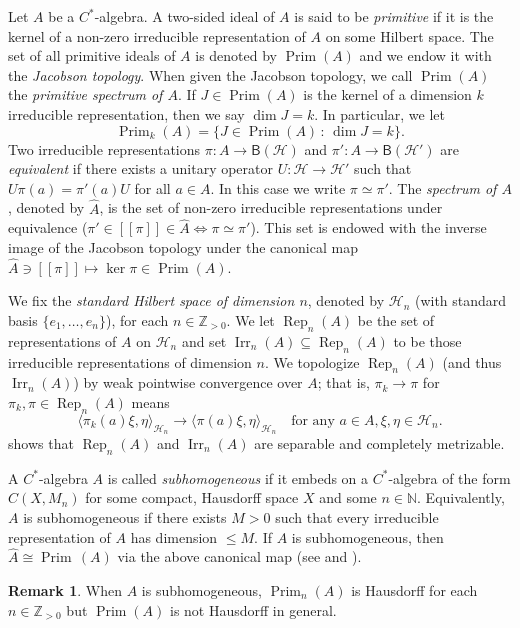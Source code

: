 \documentclass[11pt, twoside]{amsart}
\newcommand{\te}[1]{\operatorname{#1}}
\newcommand{\zn}{\mathbb{Z}}
\newcommand{\Prim}{\operatorname{Prim}}
\newcommand{\Repn}{\te{Rep}_n}
\newcommand{\Irrn}{\te{Irr}_n}
\newcommand{\sse}{\subseteq}
\newcommand{\mc}{\mathcal}
\newcommand{\wh}{\widehat}
\newcommand{\hn}{\mc{H}_n}
\newcommand{\bsf}{\textsf{B}}
\theoremstyle{definition}
\newtheorem{rmk}[thm]{Remark}
\newcommand{\B}{\mathbb}
\newcommand{\N}{\B{N}}
\begin{document}
Let $A$ be a $C^*$-algebra. A two-sided ideal of $A$ is said to be {\em primitive} if it is the kernel of a non-zero irreducible representation of $A$ on some Hilbert space. The set of all primitive ideals of $A$ is denoted by $\Prim(A)$ and we endow it with the {\em Jacobson topology}. When given the Jacobson topology, we call $\Prim(A)$ the {\em primitive spectrum of $A$}. If $J\in\Prim(A)$ is the kernel of a dimension $k$ irreducible representation, then we say $\dim J=k$. In particular, we let
\[\Prim_k(A)=\{J\in\Prim (A)\,\colon\, \dim J=k\}.\]
Two irreducible representations $\pi:A\to \bsf(\mc{H})$ and $\pi':A\rightarrow \bsf(\mc{H}')$ are \emph{equivalent} if there exists a unitary operator $U:\mc{H}\to \mc{H}'$ such that $U\pi(a)=\pi'(a)U$ for all $a\in A$. In this case we write $\pi\simeq \pi'$. The {\em spectrum of $A$}, denoted by $\wh{A}$, is the set of non-zero irreducible representations under equivalence ($\pi'\in[[\pi]]\in\wh{A}\iff\pi\simeq\pi'$). This set is endowed with the inverse image of the Jacobson topology under the canonical map $\wh{A}\ni[[\pi]]\mapsto\ker\pi\in\Prim(A)$. \par
We fix the {\em standard Hilbert space of dimension $n$},\label{rmk:standard_hilbert} denoted by $\mc{H}_n$ (with standard basis $\{e_1,\dots,e_n\}$), for each $n\in\zn_{>0}$. We let $\Repn(A)$ be the set of representations of $A$ on $\hn$ and set $\Irrn(A)\sse \Repn(A)$ to be those irreducible representations of dimension $n$. We topologize $\Repn(A)$ (and thus $\Irrn(A)$) by weak pointwise convergence over $A$; that is, $\pi_k\rightarrow\pi$ for $\pi_k,\pi\in\Repn(A)$ means
\[\langle \pi_k(a)\xi,\eta\rangle_{\hn}\rightarrow \langle \pi(a)\xi,\eta\rangle_{\hn}\quad\text{for any }a\in A,\xi,\eta\in\hn.\]
\cite[Prop 3.7.1, 3.7.4]{Dix77} shows that $\Repn(A)$ and $\Irrn(A)$ are separable and completely metrizable.

A $C^*$-algebra $A$ is called \emph{subhomogeneous} if it embeds on a $C^*$-algebra of the form $C(X,M_n)$ for some compact, Hausdorff space $X$ and some $n\in \N$. Equivalently, $A$ is subhomogeneous if there exists $M>0$ such that every irreducible representation of $A$ has dimension $\leq M$. If $A$ is subhomogeneous, then $\widehat{A}\cong \te{Prim}\,(A)$ via the above canonical map (see \cite[3.1.6 (p.71)]{Dix77} and \cite[Thm IV.15.7 (p.339)]{Bla10}). \par


\begin{rmk}\label{rmk:prim_hausdorff}
When $A$ is subhomogeneous, $\te{Prim}_n(A)$ is Hausdorff for each $n\in\zn_{>0}$ \cite[p.83]{Dix77} but $\te{Prim}(A)$ is not Hausdorff in general.
\end{rmk}
\end{document}
